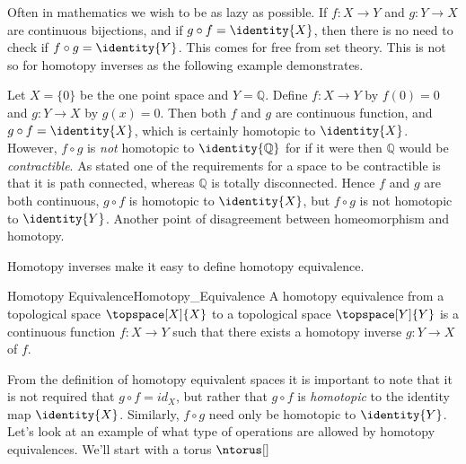 \documentclass{book}                                                           %
\begin{document}
                Often in mathematics we wish to be as lazy as possible. If
                $f:X\rightarrow{Y}$ and $g:Y\rightarrow{X}$ are continuous
                bijections, and if $g\circ{f}=\identity{X}$, then there is no
                need to check if $f\circ{g}=\identity{Y}$. This comes for free
                from set theory. This is not so for homotopy inverses as the
                following example demonstrates.
                \begin{example}
                    Let $X=\{0\}$ be the one point space and $Y=\mathbb{Q}$.
                    Define $f:X\rightarrow{Y}$ by $f(0)=0$ and
                    $g:Y\rightarrow{X}$ by $g(x)=0$. Then both $f$ and $g$ are
                    continuous function, and $g\circ{f}=\identity{X}$, which is
                    certainly homotopic to $\identity{X}$. However, $f\circ{g}$
                    is \textit{not} homotopic to $\identity{\mathbb{Q}}$ for if
                    it were then $\mathbb{Q}$ would be \textit{contractible}. As
                    stated one of the requirements for a space to be contractible
                    is that it is path connected, whereas $\mathbb{Q}$ is
                    totally disconnected. Hence $f$ and $g$ are both continuous,
                    $g\circ{f}$ is homotopic to $\identity{X}$, but
                    $f\circ{g}$ is not homotopic to $\identity{Y}$. Another
                    point of disagreement between homeomorphism and homotopy.
                \end{example}
                Homotopy inverses make it easy to define homotopy equivalence.
                \begin{fdefinition}{Homotopy Equivalence}{Homotopy_Equivalence}
                    A homotopy equivalence from a topological space
                    $\topspace[X]{X}$ to a topological space $\topspace[Y]{Y}$
                    is a continuous function $f:X\rightarrow{Y}$ such that there
                    exists a homotopy inverse $g:Y\rightarrow{X}$ of $f$.
                \end{fdefinition}
                From the definition of homotopy equivalent spaces it is
                important to note that it is not required that
                $g\circ{f}=id_{X}$, but rather that $g\circ{f}$ is
                \textit{homotopic} to the identity map $\identity{X}$.
                Similarly, $f\circ{g}$ need only be homotopic to $\identity{Y}$.
                Let's look at an example of what type of operations are allowed
                by homotopy equivalences. We'll start with a torus $\ntorus[]$
\end{document}
